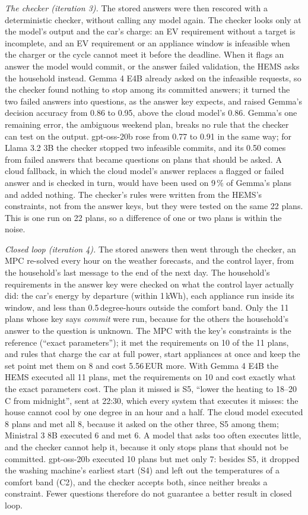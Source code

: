 \documentclass[12pt,a4paper]{report}
\begin{document}
\textit{The checker (iteration 3).} The stored answers were then
rescored with a deterministic checker, without calling any model again.
The checker looks only at the model's output and the car's charge: an
EV requirement without a target is incomplete, and an EV requirement or
an appliance window is infeasible when the charger or the cycle cannot
meet it before the deadline. When it flags an answer the model would
commit, or the answer failed validation, the HEMS asks the household
instead. Gemma 4 E4B already asked on the infeasible requests, so the
checker found nothing to stop among its committed answers; it turned
the two failed answers into questions, as the answer key expects, and
raised Gemma's decision accuracy from 0.86 to 0.95, above the cloud
model's 0.86. Gemma's one remaining error, the ambiguous weekend plan,
breaks no rule that the checker can test on the output. gpt-oss-20b
rose from 0.77 to 0.91 in the same way; for Llama 3.2 3B the checker
stopped two infeasible commits, and its 0.50 comes from failed answers
that became questions on plans that should be asked. A cloud fallback,
in which the cloud model's answer replaces a flagged or failed answer
and is checked in turn, would have been used on 9\,\% of Gemma's plans
and added nothing. The checker's rules were written from the HEMS's
constraints, not from the answer keys, but they were tested on the same
22 plans. This is one run on 22 plans, so a difference of one or two
plans is within the noise.

\textit{Closed loop (iteration 4).} The stored answers then went
through the checker, an MPC re-solved every hour on the weather
forecasts, and the control layer, from the household's last message to
the end of the next day. The household's requirements in the answer key
were checked on what the control layer actually did: the car's energy
by departure (within 1\,kWh), each appliance run inside its window, and
less than 0.5\,degree-hours outside the comfort band. Only the 11 plans
whose key says \textit{commit} were run, because for the others the
household's answer to the question is unknown. The MPC with the key's
constraints is the reference (``exact parameters''); it met the
requirements on 10 of the 11 plans, and rules that charge the car at
full power, start appliances at once and keep the set point met them on
8 and cost 5.56\,EUR more. With Gemma 4 E4B the HEMS executed all 11
plans, met the requirements on 10 and cost exactly what the exact
parameters cost. The plan it missed is S5, ``lower the heating to
18--20\,\textdegree C from midnight'', sent at 22:30, which every system
that executes it misses: the house cannot cool by one degree in an hour
and a half. The cloud model executed 8 plans and met all 8, because it
asked on the other three, S5 among them; Ministral 3 8B executed 6 and
met 6. A model that asks too often executes little, and the checker
cannot help it, because it only stops plans that should not be
committed. gpt-oss-20b executed 10 plans but met only 7: besides S5, it
dropped the washing machine's earliest start (S4) and left out the
temperatures of a comfort band (C2), and the checker accepts both,
since neither breaks a constraint. Fewer questions therefore do not
guarantee a better result in closed loop.
\end{document}
